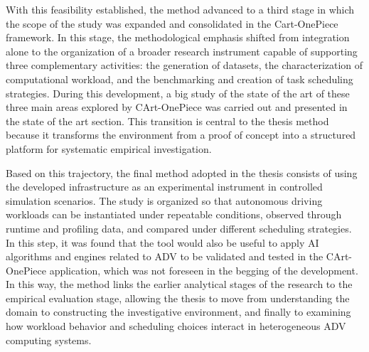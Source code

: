 With this feasibility established, the method advanced to a third stage in which the scope of the study was expanded and consolidated in the Cart-OnePiece framework. In this stage, the methodological emphasis shifted from integration alone to the organization of a broader research instrument capable of supporting three complementary activities: the generation of datasets, the characterization of computational workload, and the benchmarking and creation of task scheduling strategies. During this development, a big study of the state of the art of these three main areas explored by CArt-OnePiece was carried out and presented in the state of the art section. This transition is central to the thesis method because it transforms the environment from a proof of concept into a structured platform for systematic empirical investigation. 

Based on this trajectory, the final method adopted in the thesis consists of using the developed infrastructure as an experimental instrument in controlled simulation scenarios. The study is organized so that autonomous driving workloads can be instantiated under repeatable conditions, observed through runtime and profiling data, and compared under different scheduling strategies. In this step, it was found that the tool would also be useful to apply AI algorithms and engines related to ADV to be validated and tested in the CArt-OnePiece application, which was not foreseen in the begging of the development. In this way, the method links the earlier analytical stages of the research to the empirical evaluation stage, allowing the thesis to move from understanding the domain to constructing the investigative environment, and finally to examining how workload behavior and scheduling choices interact in heterogeneous ADV computing systems. 

